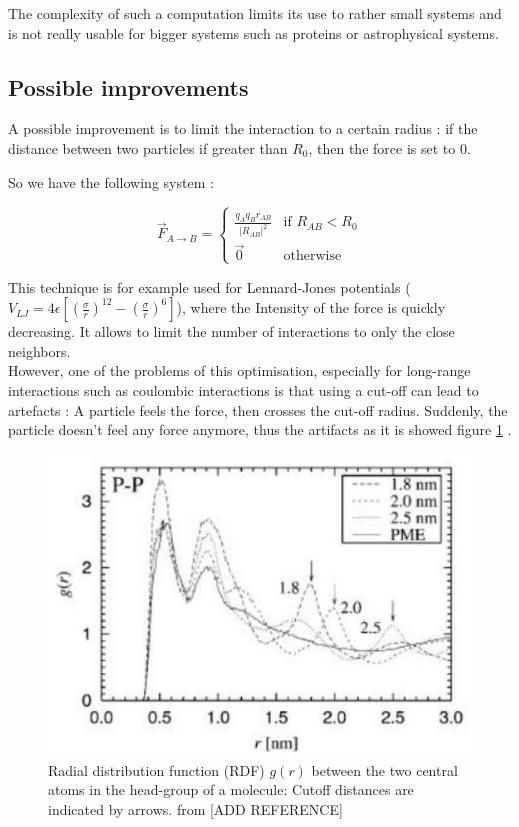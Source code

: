 \documentclass[10pt,twoside,a4paper]{report}
\begin{document}
The complexity of such a computation limits its use to rather small systems and is not really usable for bigger systems such as proteins or astrophysical systems.


\subsection{Possible improvements}

A possible improvement is to limit the interaction to a certain radius : if the distance between two particles if greater than $R_0$, then the force is set to $0$.

So we have the following system :


\begin{equation}
  \overrightarrow{F}_{A \rightarrow B}  =
	\begin{cases}
	  \frac{q_A q_B \hat{r}_{AB} }{|R_{AB}|^2}  & \text{if } R_{AB} < R_0 \\
	  \overrightarrow{0} & \text{otherwise}
	\end{cases}
\end{equation}

This technique is for example used for Lennard-Jones potentials ($V_{LJ} = 4\epsilon [(\frac{\sigma}{r})^12 - (\frac{\sigma}{r})^6] $), where the Intensity of the force is quickly decreasing. It allows to limit the number of interactions to only the close neighbors.\\

However, one of the problems of this optimisation, especially for long-range interactions such as coulombic interactions is that using a cut-off can lead to artefacts : A particle feels the force, then crosses the cut-off radius. Suddenly, the particle doesn't feel any force anymore, thus the artifacts as it is showed figure \ref{fig:artefact} .

\begin{figure}[H]

\includegraphics[scale=0.8]{artefact}
 \centering
 
\caption{Radial distribution function (RDF) $g(r)$ between the two
central atoms in the head-group of a molecule: Cutoff distances are indicated by arrows. from [ADD REFERENCE]}

\label{fig:artefact}

\end{figure}
\end{document}
